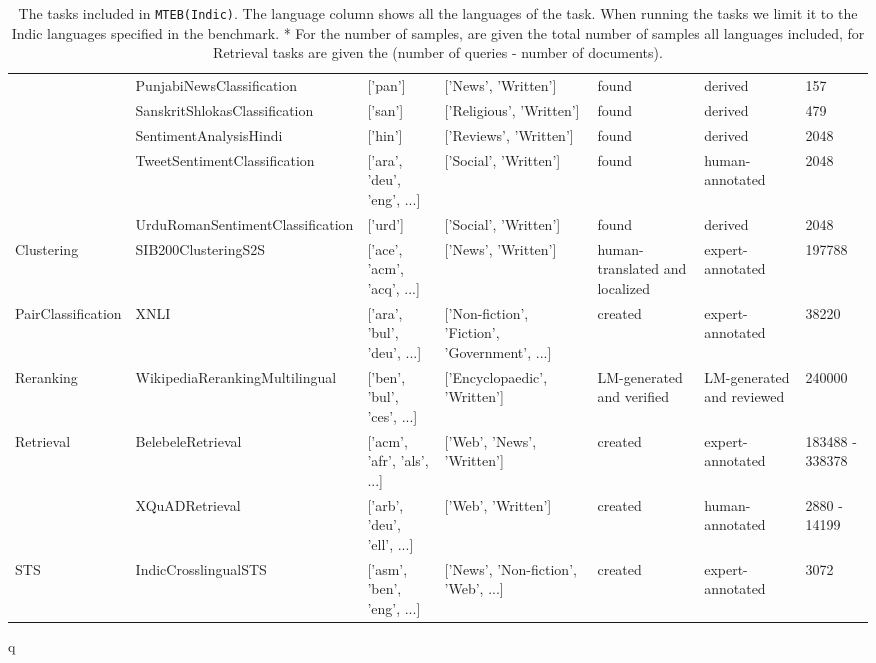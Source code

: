 \begin{table*}[!htb]
{\begin{tabular}{lllllll}
 & PunjabiNewsClassification \cite{kunchukuttan2020indicnlpcorpus} & ['pan'] & ['News', 'Written'] & found & derived & 157 \\
 & SanskritShlokasClassification \cite{arora-2020-inltk} & ['san'] & ['Religious', 'Written'] & found & derived & 479 \\
 & SentimentAnalysisHindi \cite{OdiaGenAI} & ['hin'] & ['Reviews', 'Written'] & found & derived & 2048 \\
 & TweetSentimentClassification \cite{barbieri-etal-2022-xlm} & ['ara', 'deu', 'eng', ...] & ['Social', 'Written'] & found & human-annotated & 2048 \\
 & UrduRomanSentimentClassification \cite{misc_roman_urdu_data_set_458} & ['urd'] & ['Social', 'Written'] & found & derived & 2048 \\
\cline{1-7}
Clustering & SIB200ClusteringS2S \cite{adelani2023sib} & ['ace', 'acm', 'acq', ...] & ['News', 'Written'] & human-translated and localized & expert-annotated & 197788 \\
\cline{1-7}
PairClassification & XNLI \cite{conneau2018xnli} & ['ara', 'bul', 'deu', ...] & ['Non-fiction', 'Fiction', 'Government', ...] & created & expert-annotated & 38220 \\
\cline{1-7}
Reranking & WikipediaRerankingMultilingual \cite{wikidump} & ['ben', 'bul', 'ces', ...] & ['Encyclopaedic', 'Written'] & LM-generated and verified & LM-generated and reviewed & 240000 \\
\cline{1-7}
\multirow[t]{2}{*}{Retrieval} & BelebeleRetrieval \cite{bandarkar2023belebele} & ['acm', 'afr', 'als', ...] & ['Web', 'News', 'Written'] & created & expert-annotated & 183488 - 338378 \\
 & XQuADRetrieval \cite{Artetxe:etal:2019} & ['arb', 'deu', 'ell', ...] & ['Web', 'Written'] & created & human-annotated & 2880 - 14199 \\
\cline{1-7}
STS & IndicCrosslingualSTS \cite{10.1162/tacl_a_00452} & ['asm', 'ben', 'eng', ...] & ['News', 'Non-fiction', 'Web', ...] & created & expert-annotated & 3072 \\
\cline{1-7}
\bottomrule
\end{tabular}q
}
\caption{The tasks included in \texttt{MTEB(Indic)}. The language column shows all the languages of the task. When running the tasks we limit it to the Indic languages specified in the benchmark. * For the number of samples, are given the total number of samples all languages included, for Retrieval tasks are given the (number of queries - number of documents).}
\label{tab:mteb_indic_task_overview}
\end{table*}